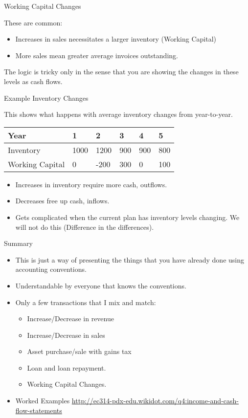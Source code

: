 \documentclass[ignorenonframetext,]{beamer}
\providecommand{\tightlist}{%
  \setlength{\itemsep}{0pt}\setlength{\parskip}{0pt}}
\begin{document}
\begin{frame}{Working Capital Changes}

These are common:

\begin{itemize}
\tightlist
\item
  Increases in sales necessitates a larger inventory (Working Capital)
\item
  More sales mean greater average invoices outstanding.
\end{itemize}

The logic is tricky only in the sense that you are showing the changes
in these levels as cash flows.

\end{frame}

\begin{frame}{Example Inventory Changes}

This shows what happens with average inventory changes from
year-to-year.

\begin{longtable}[]{@{}llllll@{}}
\toprule
Year & 1 & 2 & 3 & 4 & 5\tabularnewline
\midrule
\endhead
Inventory & 1000 & 1200 & 900 & 900 & 800\tabularnewline
Working Capital & 0 & -200 & 300 & 0 & 100\tabularnewline
\bottomrule
\end{longtable}

\begin{itemize}
\tightlist
\item
  Increases in inventory require more cash, outflows.
\item
  Decreases free up cash, inflows.
\item
  Gets complicated when the current plan has inventory levels changing.
  We will not do this (Difference in the differences).
\end{itemize}

\end{frame}

\begin{frame}{Summary}

\begin{itemize}
\tightlist
\item
  This is just a way of presenting the things that you have already done
  using accounting conventions.
\item
  Understandable by everyone that knows the conventions.
\item
  Only a few transactions that I mix and match:

  \begin{itemize}
  \tightlist
  \item
    Increase/Decrease in revenue
  \item
    Increase/Decrease in sales
  \item
    Asset purchase/sale with gains tax
  \item
    Loan and loan repayment.
  \item
    Working Capital Changes.
  \end{itemize}
\item
  Worked Examples
  \url{http://ec314-pdx-edu.wikidot.com/q4:income-and-cash-flow-statements}
\end{itemize}

\end{frame}
\end{document}
